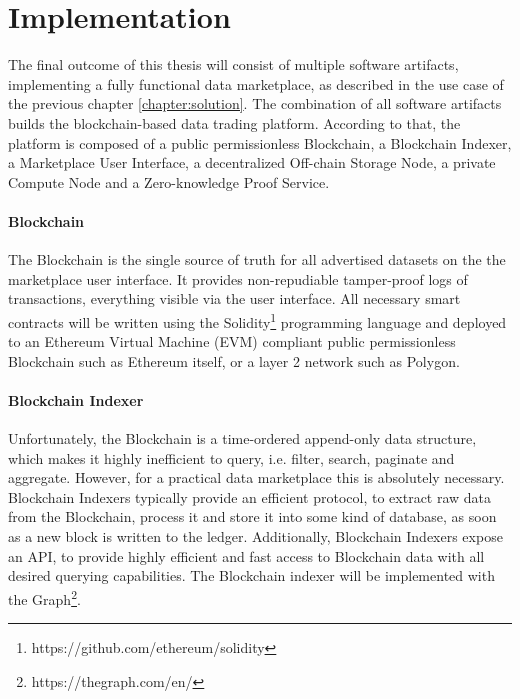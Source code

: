 \chapter{Implementation}
\label{cha:implementation}

The final outcome of this thesis will consist of multiple software artifacts, implementing a fully functional data marketplace, as described in the use case of the previous chapter \ref{chapter:solution}. The combination of all software artifacts builds the blockchain-based data trading platform. According to that, the platform is composed of a public permissionless Blockchain, a Blockchain Indexer, a Marketplace User Interface, a decentralized Off-chain Storage Node, a private Compute Node and a Zero-knowledge Proof Service. 

\subsubsection{Blockchain}
The Blockchain is the single source of truth for all advertised datasets on the the marketplace user interface. It provides non-repudiable tamper-proof logs of transactions, everything visible via the user interface. All necessary smart contracts will be written using the Solidity\footnote{https://github.com/ethereum/solidity} programming language and deployed to an Ethereum Virtual Machine (EVM) compliant public permissionless Blockchain such as Ethereum itself, or a layer 2 network such as Polygon. 

\subsubsection{Blockchain Indexer}
Unfortunately, the Blockchain is a time-ordered append-only data structure, which makes it highly inefficient to query, i.e. filter, search, paginate and aggregate. However, for a practical data marketplace this is absolutely necessary. Blockchain Indexers typically provide an efficient protocol, to extract raw data from the Blockchain, process it and store it into some kind of database, as soon as a new block is written to the ledger. Additionally, Blockchain Indexers expose an API, to provide highly efficient and fast access to Blockchain data with all desired querying capabilities. The Blockchain indexer will be implemented with the Graph\footnote{https://thegraph.com/en/}.

